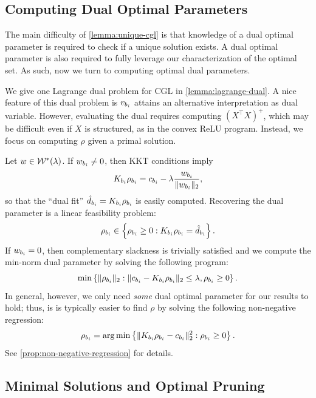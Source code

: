 \subsection{Computing Dual Optimal Parameters}

The main difficulty of \cref{lemma:unique-cgl}
is that knowledge of a dual optimal parameter is required to check if a
unique solution exists.
A dual optimal parameter is also required to fully leverage our
characterization of the optimal set.
As such, now we turn to computing optimal dual parameters.

We give one Lagrange dual problem for CGL in \cref{lemma:lagrange-dual}.
A nice feature of this dual problem is \( v_{b_i} \) attains an
alternative interpretation as dual variable.
However, evaluating the dual requires computing \( (X^\top X)^+ \),
which may be difficult even if \( X \) is structured, as in the convex
ReLU program.
Instead, we focus on computing \( \rho \) given a primal solution.

Let \( w \in \mathcal{W}^*(\lambda) \).
If \( w_{b_i} \neq 0 \), then KKT conditions imply
\begin{equation}\label{eq:dual-active}
    K_{{b_i}} \rho_{{b_i}} = c_{b_i} - \lambda \frac{w_{b_i}}{\|w_{b_i}\|_2},
\end{equation}
so that the ``dual fit'' \( \hat d_{b_i} = K_{{b_i}} \rho_{{b_i}} \) is easily computed.
Recovering the dual parameter is a linear feasibility problem:
\begin{equation}\label{eq:dual-active-lp}
    \rho_{{b_i}} \in \left\{\rho_{{b_i}} \geq 0 : K_{{b_i}} \rho_{{b_i}} = \hat d_{b_i}\right\}.
\end{equation}
If \( w_{b_i} = 0 \), then complementary slackness is trivially satisfied and we
compute the min-norm dual parameter by solving the following program:
\begin{equation}\label{eq:dual-inactive}
    \min \left\{\|\rho_{{b_i}}\|_2 : \|c_{b_i} - K_{{b_i}} \rho_{{b_i}}\|_2 \leq \lambda, \rho_{{b_i}} \geq 0 \right\}.
\end{equation}
In general, however, we only need \emph{some} dual optimal parameter for
our results to hold; thus, is is typically easier to find \( \rho \)
by solving the following non-negative regression:
\begin{equation}\label{eq:non-negative-regression}
    \rho_{{b_i}} = \mathop{\rm arg\,min} \left\{\|K_{{b_i}} \rho_{{b_i}} - c_{b_i}\|^2_2 : \rho_{{b_i}} \geq 0 \right\}.
\end{equation}
See \cref{prop:non-negative-regression} for details.

\subsection{Minimal Solutions and Optimal Pruning}\label{sec:pruning}

